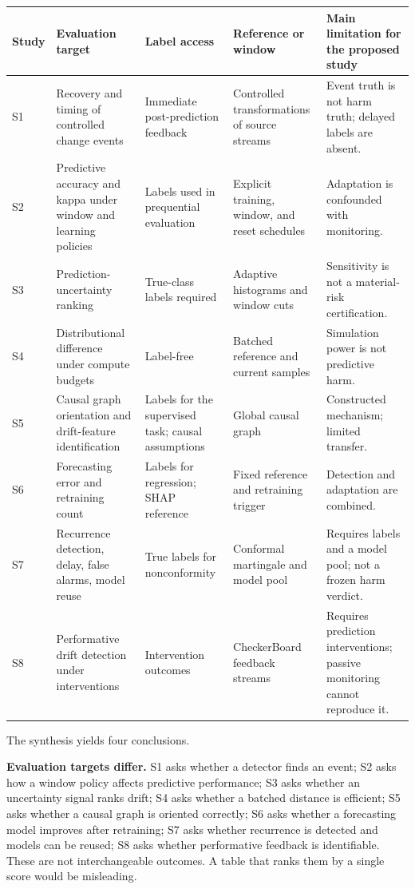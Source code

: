 \documentclass[
]{article}
\begin{document}
\begin{longtable}[]{@{}
  >{\raggedright\arraybackslash}p{}
  >{\raggedright\arraybackslash}p{}
  >{\raggedright\arraybackslash}p{}
  >{\raggedright\arraybackslash}p{}
  >{\raggedright\arraybackslash}p{}@{}}
\toprule
Study & Evaluation target & Label access & Reference or window & Main
limitation for the proposed study \\
\midrule
\endhead
S1 & Recovery and timing of controlled change events & Immediate
post-prediction feedback & Controlled transformations of source streams
& Event truth is not harm truth; delayed labels are absent. \\
S2 & Predictive accuracy and kappa under window and learning policies &
Labels used in prequential evaluation & Explicit training, window, and
reset schedules & Adaptation is confounded with monitoring. \\
S3 & Prediction-uncertainty ranking & True-class labels required &
Adaptive histograms and window cuts & Sensitivity is not a material-risk
certification. \\
S4 & Distributional difference under compute budgets & Label-free &
Batched reference and current samples & Simulation power is not
predictive harm. \\
S5 & Causal graph orientation and drift-feature identification & Labels
for the supervised task; causal assumptions & Global causal graph &
Constructed mechanism; limited transfer. \\
S6 & Forecasting error and retraining count & Labels for regression;
SHAP reference & Fixed reference and retraining trigger & Detection and
adaptation are combined. \\
S7 & Recurrence detection, delay, false alarms, model reuse & True
labels for nonconformity & Conformal martingale and model pool &
Requires labels and a model pool; not a frozen harm verdict. \\
S8 & Performative drift detection under interventions & Intervention
outcomes & CheckerBoard feedback streams & Requires prediction
interventions; passive monitoring cannot reproduce it. \\
\bottomrule
\end{longtable}

The synthesis yields four conclusions.

\textbf{Evaluation targets differ.} S1 asks whether a detector finds an
event; S2 asks how a window policy affects predictive performance; S3
asks whether an uncertainty signal ranks drift; S4 asks whether a
batched distance is efficient; S5 asks whether a causal graph is
oriented correctly; S6 asks whether a forecasting model improves after
retraining; S7 asks whether recurrence is detected and models can be
reused; S8 asks whether performative feedback is identifiable. These are
not interchangeable outcomes. A table that ranks them by a single score
would be misleading.
\end{document}
